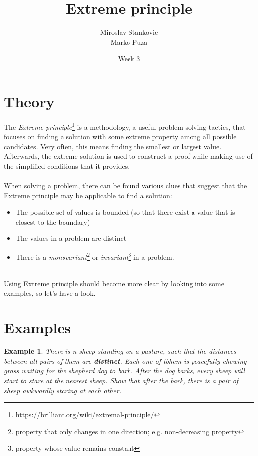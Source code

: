 \documentclass[12pt]{article}
\title{\textbf{Extreme principle}}
\date{Week 3}
\author{Miroslav Stankovic\\ Marko Puza}
\newtheorem{theorem}{Example}
\begin{document}
\maketitle

\section{Theory}

The \emph{Extreme principle}\footnote{https://brilliant.org/wiki/extremal-principle/} is a methodology, a useful problem solving tactics, that focuses on finding a solution with some extreme property among all possible candidates. Very often, this means finding the smallest or largest value. Afterwards, the extreme solution is used to construct a proof while making use of the simplified conditions that it provides.
\\\\
When solving a problem, there can be found various clues that suggest that the Extreme principle may be applicable to find a solution:
\begin{itemize}
	\item{The possible set of values is bounded (so that there exist 	a value that is closest to the boundary)}
	\item{The values in a problem are distinct}
	\item{There is a \emph{monovariant}\footnote{property that only changes in one direction; e.g. non-decreasing property} or \emph{invariant}\footnote{property whose value remains constant} in a problem.}
\end{itemize}


\noindent \\ Using Extreme principle should become more clear by looking into some examples, so let's have a look. 

\section{Examples}

\begin{theorem}
There is n sheep standing on a pasture, such that the distances between all pairs of them are \textbf{distinct}. Each one of tbhem is peacefully chewing grass waiting for the shepherd dog to bark. After the dog barks, every sheep will start to stare at the nearest sheep. Show that after the bark, there is a pair of sheep awkwardly staring at each other. 
\end{theorem}
\end{document}
